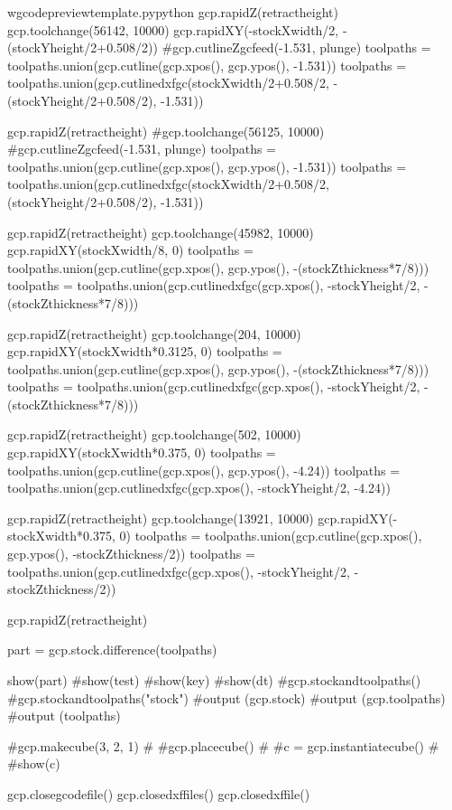 \documentclass{ltxdoc}
\begin{document}
\begin{writecode}{w}{gcodepreviewtemplate.py}{python}
gcp.rapidZ(retractheight)
gcp.toolchange(56142, 10000)
gcp.rapidXY(-stockXwidth/2, -(stockYheight/2+0.508/2))
#gcp.cutlineZgcfeed(-1.531, plunge)
toolpaths = toolpaths.union(gcp.cutline(gcp.xpos(), gcp.ypos(), -1.531))
toolpaths = toolpaths.union(gcp.cutlinedxfgc(stockXwidth/2+0.508/2, -(stockYheight/2+0.508/2), -1.531))

gcp.rapidZ(retractheight)
#gcp.toolchange(56125, 10000)
#gcp.cutlineZgcfeed(-1.531, plunge)
toolpaths = toolpaths.union(gcp.cutline(gcp.xpos(), gcp.ypos(), -1.531))
toolpaths = toolpaths.union(gcp.cutlinedxfgc(stockXwidth/2+0.508/2, (stockYheight/2+0.508/2), -1.531))

gcp.rapidZ(retractheight)
gcp.toolchange(45982, 10000)
gcp.rapidXY(stockXwidth/8, 0)
toolpaths = toolpaths.union(gcp.cutline(gcp.xpos(), gcp.ypos(), -(stockZthickness*7/8)))
toolpaths = toolpaths.union(gcp.cutlinedxfgc(gcp.xpos(), -stockYheight/2, -(stockZthickness*7/8)))

gcp.rapidZ(retractheight)
gcp.toolchange(204, 10000)
gcp.rapidXY(stockXwidth*0.3125, 0)
toolpaths = toolpaths.union(gcp.cutline(gcp.xpos(), gcp.ypos(), -(stockZthickness*7/8)))
toolpaths = toolpaths.union(gcp.cutlinedxfgc(gcp.xpos(), -stockYheight/2, -(stockZthickness*7/8)))

gcp.rapidZ(retractheight)
gcp.toolchange(502, 10000)
gcp.rapidXY(stockXwidth*0.375, 0)
toolpaths = toolpaths.union(gcp.cutline(gcp.xpos(), gcp.ypos(), -4.24))
toolpaths = toolpaths.union(gcp.cutlinedxfgc(gcp.xpos(), -stockYheight/2, -4.24))

gcp.rapidZ(retractheight)
gcp.toolchange(13921, 10000)
gcp.rapidXY(-stockXwidth*0.375, 0)
toolpaths = toolpaths.union(gcp.cutline(gcp.xpos(), gcp.ypos(), -stockZthickness/2))
toolpaths = toolpaths.union(gcp.cutlinedxfgc(gcp.xpos(), -stockYheight/2, -stockZthickness/2))

gcp.rapidZ(retractheight)

part = gcp.stock.difference(toolpaths)

show(part)
#show(test)
#show(key)
#show(dt)
#gcp.stockandtoolpaths()
#gcp.stockandtoolpaths("stock")
#output (gcp.stock)
#output (gcp.toolpaths)
#output (toolpaths)

#gcp.makecube(3, 2, 1)
#
#gcp.placecube()
#
#c = gcp.instantiatecube()
#
#show(c)

gcp.closegcodefile()
gcp.closedxffiles()
gcp.closedxffile()

\end{writecode}
\addtocounter{gcptmplpy}{328}
\end{document}
